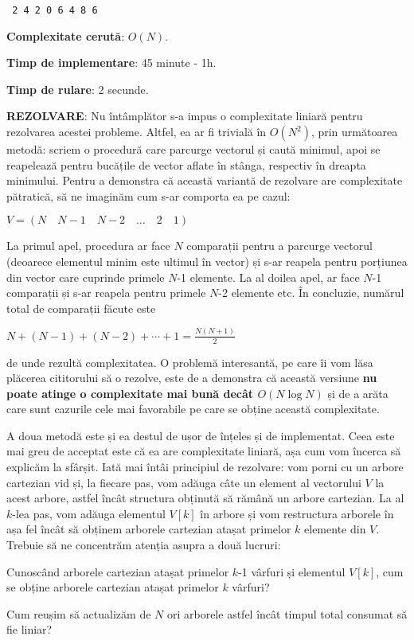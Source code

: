 \texttt{
2 4 2 0 6 4 8 6
}

{\bf Complexitate cerută}: $O(N)$.

{\bf Timp de implementare}: 45 minute - 1h.

{\bf Timp de rulare}: 2 secunde.

{\bf REZOLVARE}: Nu întâmplător s-a impus o complexitate liniară pentru rezolvarea acestei probleme. Altfel, ea ar fi trivială în $O(N^2)$, prin următoarea metodă: scriem o procedură care parcurge vectorul și caută minimul, apoi se reapelează pentru bucățile de vector aflate în stânga, respectiv în dreapta minimului. Pentru a demonstra că această variantă de rezolvare are complexitate pătratică, să ne imaginăm cum s-ar comporta ea pe cazul:

$V = (N \quad N-1 \quad N-2 \quad \dots \quad 2 \quad 1)$

La primul apel, procedura ar face $N$ comparații pentru a parcurge vectorul (deoarece elementul minim este ultimul în vector) și s-ar reapela pentru porțiunea din vector care cuprinde primele $N$-1 elemente. La al doilea apel, ar face $N$-1 comparații și s-ar reapela pentru primele $N$-2 elemente etc. În concluzie, numărul total de comparații făcute este

$N + (N-1) + (N-2) + \cdots + 1 = \frac{N(N + 1)}{2}$

de unde rezultă complexitatea. O problemă interesantă, pe care îi vom lăsa plăcerea cititorului să o rezolve, este de a demonstra că această versiune {\bf nu poate atinge o complexitate mai bună decât $O(N \log N)$} și de a arăta care sunt cazurile cele mai favorabile pe care se obține această complexitate.

A doua metodă este și ea destul de ușor de înțeles și de implementat. Ceea este mai greu de acceptat este că ea are complexitate liniară, așa cum vom încerca să explicăm la sfârșit. Iată mai întâi principiul de rezolvare: vom porni cu un arbore cartezian vid și, la fiecare pas, vom adăuga câte un element al vectorului $V$ la acest arbore, astfel încât structura obținută să rămână un arbore cartezian. La al $k$-lea pas, vom adăuga elementul $V[k]$ în arbore și vom restructura arborele în așa fel încât să obținem arborele cartezian atașat primelor $k$ elemente din $V$. Trebuie să ne concentrăm atenția asupra a două lucruri:

\item Cunoscând arborele cartezian atașat primelor $k$-1 vârfuri și elementul $V[k]$, cum se obține arborele cartezian atașat primelor $k$ vârfuri?
\item Cum reușim să actualizăm de $N$ ori arborele astfel încât timpul total consumat să fie liniar?

